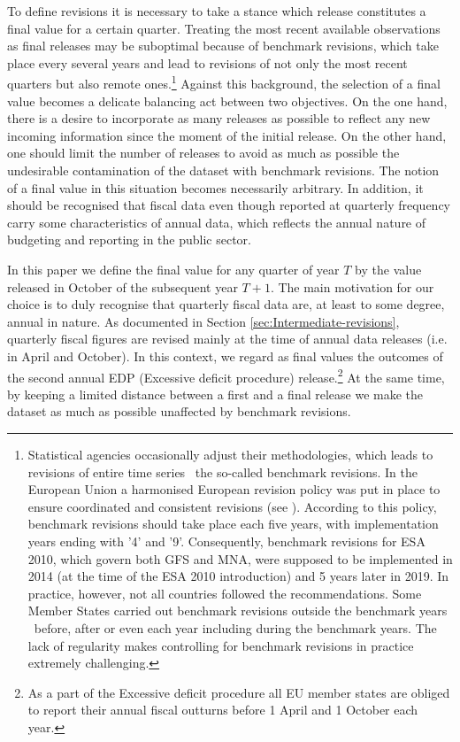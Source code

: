 To define revisions it is necessary to take a stance which release
constitutes a final value for a certain quarter. Treating the most
recent available observations as final releases may be suboptimal
because of benchmark revisions, which take place every several years
and lead to revisions of not only the most recent quarters but also
remote ones.\footnote{Statistical agencies occasionally adjust their methodologies, which
leads to revisions of entire time series \textemdash~the so-called benchmark
revisions. In the European Union a harmonised European revision policy was put in place to 
ensure coordinated and consistent revisions (see \citet{ec_revision_guidelines}). According
to this policy, benchmark revisions should take place each five years, with implementation
years ending with '4' and '9'. Consequently, benchmark revisions for ESA 2010, which govern
both GFS and MNA, were supposed to be implemented in 2014 (at the time of the ESA 2010
introduction) and 5 years later in 2019. In practice, however, not all countries 
followed the recommendations. Some Member States carried out benchmark revisions outside 
the benchmark years \textemdash~before, after or even each year including during the benchmark years.
The lack of regularity makes controlling for benchmark revisions in practice extremely challenging.} 
Against this background, the selection of a final value becomes a
delicate balancing act between two objectives. On the one hand, there
is a desire to incorporate as many releases as possible to reflect
any new incoming information since the moment of the initial release. On the other hand,
one should limit the number of releases to avoid as much
as possible the undesirable contamination of the dataset with benchmark
revisions. The notion of a final value in this situation becomes necessarily
arbitrary. In addition, it should be recognised that fiscal data even
though reported at quarterly frequency carry some characteristics
of annual data, which reflects the annual nature of budgeting and
reporting in the public sector.

In this paper we define the final value for any quarter of year \emph{$T$}
by the value released in October of the subsequent year $T+1$. The main motivation for our choice is to
duly recognise that quarterly fiscal data are, at least to some degree,
annual in nature. As documented in Section \ref{sec:Intermediate-revisions},
quarterly fiscal figures are revised mainly at the time of annual
data releases (i.e. in April and October). In this context, we regard as final values the outcomes of the second annual EDP (Excessive deficit procedure) release.\footnote{As a part of the Excessive deficit procedure all EU member states are obliged to report their annual fiscal outturns before 1 April and 1 October each year.} At the same time, by keeping a limited distance between
a first and a final release we make the dataset as much as possible
unaffected by benchmark revisions. 


